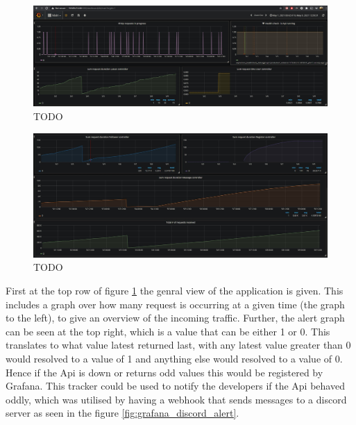 \documentclass[report/main.tex]{subfiles}
\begin{document}
            \begin{figure}[H]
                \centering
                \includegraphics[width=\textwidth]{report/images/Grafana EvilTwitter 1.jpg}
                \caption{TODO}
                \label{fig:grafana_setup_1}
            \end{figure}
                
            \begin{figure}[H]
                \centering
                \includegraphics[width=\textwidth]{report/images/Grafana EvilTwitter 2.jpg}
                \caption{TODO}
                \label{fig:grafana_setup_2}
            \end{figure}
            
            First at the top row of figure \ref{fig:grafana_setup_1} the genral view of the application is given. This includes a graph over how many request is occurring at a given time (the graph to the left), to give an overview of the incoming traffic. Further, the alert graph can be seen at the top right, which is a value that can be either 1 or 0. This translates to what value latest returned last, with any latest value greater than 0 would resolved to a value of 1 and anything else would resolved to a value of 0. Hence if the Api is down or returns odd values this would be registered by Grafana. This tracker could be used to notify the developers if the Api behaved oddly, which was utilised by having a webhook that sends messages to a discord server as seen in the figure \ref{fig:grafana_discord_alert}.
                
\end{document}
